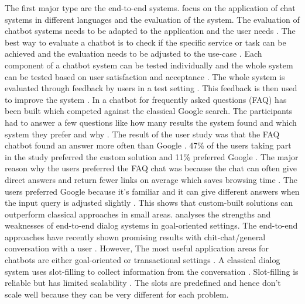 The first major type are the end-to-end systems.
\citet{evaluateChatbotsShawar2007} focus on the application of chat systems in different languages and the evaluation of the system.
The evaluation of chatbot systems needs to be adapted to the application and the user needs \cite{evaluateChatbotsShawar2007}.
The best way to evaluate a chatbot is to check if the specific service or task can be achieved and the evaluation needs to be adjusted to the use-case \cite{evaluateChatbotsShawar2007}.
Each component of a chatbot system can be tested individually and the whole system can be tested based on user satisfaction and acceptance \cite{evaluateChatbotsShawar2007}.
The whole system is evaluated through feedback by users in a test setting \cite{evaluateChatbotsShawar2007}.
This feedback is then used to improve the system \cite{evaluateChatbotsShawar2007}. 
In \citet{evaluateChatbotsShawar2007} a chatbot for frequently asked questions (FAQ) has been built which competed against the classical Google search.
The participants had to answer a few questions like how many results the system found and which system they prefer and why \cite{evaluateChatbotsShawar2007}. 
The result of the user study was that the FAQ chatbot found an answer more often than Google \cite{evaluateChatbotsShawar2007}.
47\% of the users taking part in the study preferred the custom solution and 11\% preferred Google \cite{evaluateChatbotsShawar2007}.
The major reason why the users preferred the FAQ chat was because the chat can often give direct answers and return fewer links on average which saves browsing time \cite{evaluateChatbotsShawar2007}. 
The users preferred Google because it's familiar and it can give different answers when the input query is adjusted slightly \cite{evaluateChatbotsShawar2007}.
This shows that custom-built solutions can outperform classical approaches in small areas.
\citet{bordes2016learning} analyses the strengths and weaknesses of end-to-end dialog systems in goal-oriented settings.
The end-to-end approaches have recently shown promising results with chit-chat/general conversation with a user \cite{bordes2016learning}.
However, The most useful application areas for chatbots are either goal-oriented or transactional settings \cite{bordes2016learning}.
A classical dialog system uses slot-filling to collect information from the conversation \cite{bordes2016learning}.
Slot-filling is reliable but has limited scalability \cite{bordes2016learning}.
The slots are predefined and hence don't scale well because they can be very different for each problem. 

